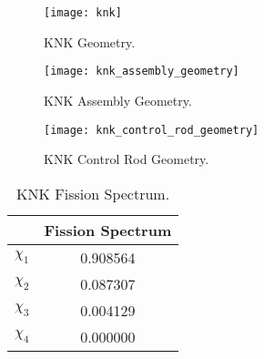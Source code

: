    \begin{figure}
      \centering
      \texttt{[image: knk]}
      \caption{KNK Geometry.}
      \label{fig:knk_geom}
    \end{figure}

    \begin{figure}
      \centering
      \texttt{[image: knk\_assembly\_geometry]}
      \caption{KNK Assembly Geometry.}
      \label{fig:knk_assembly_geom}
    \end{figure}

    \begin{figure}
      \centering
      \texttt{[image: knk\_control\_rod\_geometry]}
      \caption{KNK Control Rod Geometry.}
      \label{fig:knk_cr_geom}
    \end{figure}
    
    \begin{table}
      \caption{KNK Fission Spectrum.}
      \label{tab:knkchi}
      \begin{center}
        \begin{tabular}{cc}
          \toprule
          &Fission Spectrum \\ 
          \midrule
          $\chi_1$&0.908564 \\
          $\chi_2$&0.087307 \\
          $\chi_3$&0.004129 \\
          $\chi_4$&0.000000 \\
          \bottomrule
        \end{tabular}
      \end{center}
    \end{table}

